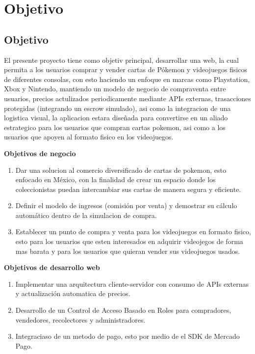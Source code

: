 \documentclass[letterpaper,11pt]{article}
\begin{document}


\newpage
{%
  \makeatletter
  \let\ps@plain\ps@indice
  \makeatother
  \pagestyle{indice}
  \hypersetup{linkcolor=black}\tableofcontents
}


\newpage

\pagestyle{fancy}
\setcounter{page}{1}
\singlespacing

\section{Objetivo}
\subsection{Objetivo}

El presente proyecto tiene como objetiv principal, desarrollar una web, 
la cual permita a los usuarios comprar y vender cartas de Pókemon
y videojuegos fisicos de diferentes consolas, con esto 
haciendo un enfoque en marcas como Playstation, Xbox y Nintendo, mantiendo un modelo 
de negocio de compraventa entre usuarios, precios actulizados periodicamente mediante APIs externas,
trasacciones protegidas (integrando un escrow simulado), asi como la integracion de una logistica visual, la aplicacion estara diseñada 
para convertirse en un aliado estrategico para los usuarios que compran cartas pokemon, asi como a los usuarios que apoyen al formato fisico en los videojuegos.


\textbf{Objetivos de negocio}
\begin{enumerate}[label=\textbf{ON\arabic*.}, leftmargin=*]
    \item Dar una solucion al comercio diversificado de cartas 
    de pokemon, esto enfocado en México, con la finalidad de crear un espacio donde los coleccionistas puedan intercambiar sus cartas de manera segura y eficiente.
    \item Definir el modelo de ingresos (comisión por venta) y demostrar su cálculo automático dentro de la simulacion de compra.
    \item Establecer un punto de compra y venta para los videojuegos en formato fisico, esto para 
    los usuarios que esten interesados en adquirir videojegos de forma mas barata y para los usuarios que quieran vender sus videojuegos usados.
\end{enumerate}

\textbf{Objetivos de desarrollo web}
\begin{enumerate}[label=\textbf{OD\arabic*.}, leftmargin=*]
    \item Implementar una arquitectura cliente-servidor con consumo de APIs externas y actualización automatica de precios.
    \item Desarrollo de un Control de Acceso Basado en Roles para compradores, vendedores, recolectores y administradores.
    \item Integraciaso de un metodo de pago, esto por medio de el SDK de Mercado Pago.
\end{enumerate}
\end{document}
